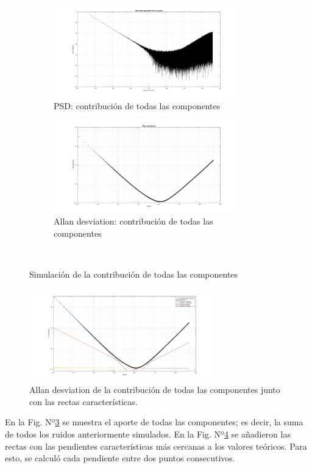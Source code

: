 \documentclass[a4paper,11pt,twoside]{IT-CNEA}
\begin{document}
\begin{figure}[t!]
    \centering
    \begin{subfigure}[t]{0.5\textwidth}
        \centering
        \includegraphics[width=8cm]{Figuras/PSDRuidosTodos.png}
        \caption{PSD: contribución de todas las componentes}
        \label{fig:}
    \end{subfigure}%
    \begin{subfigure}[t]{0.5\textwidth}
        \centering
        \includegraphics[width=8cm]{Figuras/AllanRuidosTodos.png}
        \caption{Allan desviation: contribución de todas las componentes}
        \label{fig:}
    \end{subfigure}%
    ~ 
    \caption{Simulación de la contribución de todas las componentes}
    \label{fig:simulacionRuidosTodos}
\end{figure}
\begin{figure}[h!]
\centering
\includegraphics[width=8cm]{Figuras/AllanRuidosTodosConRectas.png}
\caption{Allan desviation de la contribución de todas las componentes junto con las rectas características.}
\label{fig:simulacionRuidosTodosRectas}
\end{figure}
\par En la Fig. Nº\ref{fig:simulacionRuidosTodos} se muestra el aporte de todas las componentes; es decir, la suma de todos los ruidos anteriormente simulados. En la Fig. Nº\ref{fig:simulacionRuidosTodosRectas} se añadieron las rectas con las pendientes características más cercanas a los valores teóricos. Para esto, se calculó cada pendiente entre dos puntos consecutivos. 
\end{document}
